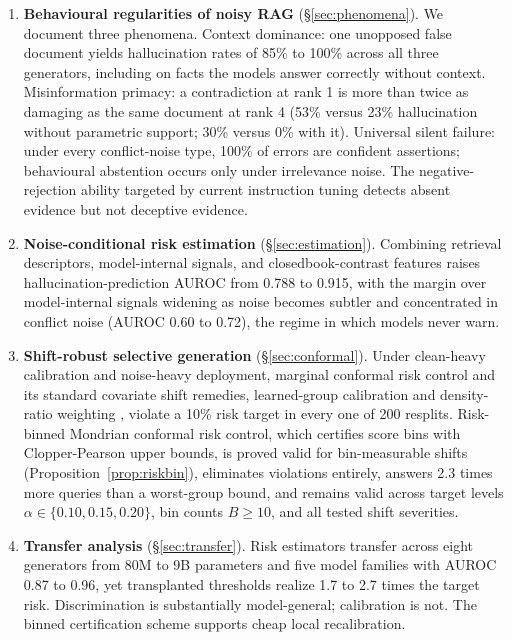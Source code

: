 \documentclass[sn-basic]{sn-jnl}
\theoremstyle{thmstyleone}
\theoremstyle{thmstyletwo}
\begin{document}
\begin{enumerate}
\item \textbf{Behavioural regularities of noisy RAG}
(\S\ref{sec:phenomena}). We document three phenomena. Context
dominance: one unopposed false document yields hallucination rates of
85\% to 100\% across all three generators, including on facts the
models answer correctly without context. Misinformation primacy: a
contradiction at rank 1 is more than twice as damaging as the same
document at rank 4 (53\% versus 23\% hallucination without parametric
support; 30\% versus 0\% with it). Universal silent failure: under
every conflict-noise type, 100\% of errors are confident assertions;
behavioural abstention occurs only under irrelevance noise. The
negative-rejection ability targeted by current instruction tuning
\citep{chen2023rgb} detects absent evidence but not
deceptive evidence.
\item \textbf{Noise-conditional risk estimation}
(\S\ref{sec:estimation}). Combining retrieval descriptors, model-internal signals, and
closedbook-contrast features raises hallucination-prediction AUROC from 0.788
to 0.915, with the margin over model-internal signals widening as noise becomes
subtler and concentrated in conflict noise (AUROC 0.60 to 0.72), the regime in
which models never warn.
\item \textbf{Shift-robust selective generation}
(\S\ref{sec:conformal}). Under clean-heavy calibration and noise-heavy
deployment, marginal conformal risk control and its standard covariate
shift remedies, learned-group calibration and density-ratio weighting
\citep{tibshirani2019covariate}, violate a 10\% risk target in every
one of 200 resplits. Risk-binned Mondrian conformal risk control,
which certifies score bins with Clopper-Pearson upper bounds, is proved
valid for bin-measurable shifts (Proposition~\ref{prop:riskbin}),
eliminates violations entirely, answers 2.3 times more queries than a
worst-group bound, and remains valid across target levels
$\alpha \in \{0.10, 0.15, 0.20\}$, bin counts $B \ge 10$, and all
tested shift severities.
\item \textbf{Transfer analysis} (\S\ref{sec:transfer}). Risk
estimators transfer across eight generators from 80M to 9B parameters
and five model families with AUROC 0.87 to 0.96, yet
transplanted thresholds realize 1.7 to 2.7 times the target risk.
Discrimination is substantially model-general; calibration is not. The binned certification scheme supports cheap local recalibration.
\end{enumerate}
\end{document}
